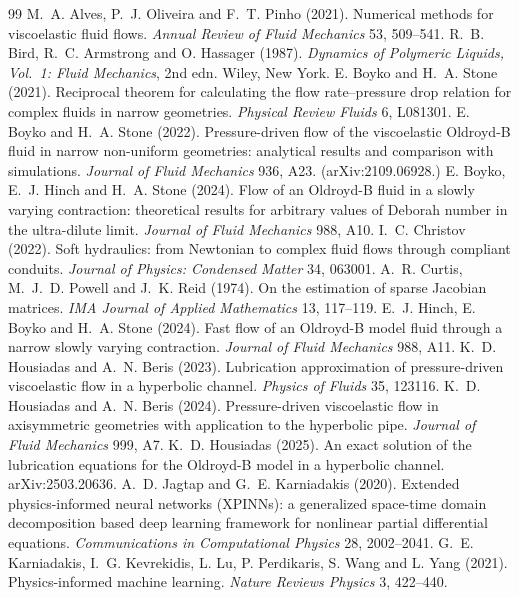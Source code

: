 \documentclass[11pt,a4paper]{article}
\begin{document}
\begin{thebibliography}{99}\small
\setlength{\itemsep}{1pt}
 M.~A. Alves, P.~J. Oliveira and F.~T. Pinho (2021). Numerical methods for viscoelastic fluid flows. \emph{Annual Review of Fluid Mechanics} 53, 509--541.
 R.~B. Bird, R.~C. Armstrong and O. Hassager (1987). \emph{Dynamics of Polymeric Liquids, Vol.~1: Fluid Mechanics}, 2nd edn. Wiley, New York.
 E. Boyko and H.~A. Stone (2021). Reciprocal theorem for calculating the flow rate--pressure drop relation for complex fluids in narrow geometries. \emph{Physical Review Fluids} 6, L081301.
 E. Boyko and H.~A. Stone (2022). Pressure-driven flow of the viscoelastic Oldroyd-B fluid in narrow non-uniform geometries: analytical results and comparison with simulations. \emph{Journal of Fluid Mechanics} 936, A23. (arXiv:2109.06928.)
 E. Boyko, E.~J. Hinch and H.~A. Stone (2024). Flow of an Oldroyd-B fluid in a slowly varying contraction: theoretical results for arbitrary values of Deborah number in the ultra-dilute limit. \emph{Journal of Fluid Mechanics} 988, A10.
 I.~C. Christov (2022). Soft hydraulics: from Newtonian to complex fluid flows through compliant conduits. \emph{Journal of Physics: Condensed Matter} 34, 063001.
 A.~R. Curtis, M.~J.~D. Powell and J.~K. Reid (1974). On the estimation of sparse Jacobian matrices. \emph{IMA Journal of Applied Mathematics} 13, 117--119.
 E.~J. Hinch, E. Boyko and H.~A. Stone (2024). Fast flow of an Oldroyd-B model fluid through a narrow slowly varying contraction. \emph{Journal of Fluid Mechanics} 988, A11.
 K.~D. Housiadas and A.~N. Beris (2023). Lubrication approximation of pressure-driven viscoelastic flow in a hyperbolic channel. \emph{Physics of Fluids} 35, 123116.
 K.~D. Housiadas and A.~N. Beris (2024). Pressure-driven viscoelastic flow in axisymmetric geometries with application to the hyperbolic pipe. \emph{Journal of Fluid Mechanics} 999, A7.
 K.~D. Housiadas (2025). An exact solution of the lubrication equations for the Oldroyd-B model in a hyperbolic channel. arXiv:2503.20636.
 A.~D. Jagtap and G.~E. Karniadakis (2020). Extended physics-informed neural networks (XPINNs): a generalized space-time domain decomposition based deep learning framework for nonlinear partial differential equations. \emph{Communications in Computational Physics} 28, 2002--2041.
 G.~E. Karniadakis, I.~G. Kevrekidis, L. Lu, P. Perdikaris, S. Wang and L. Yang (2021). Physics-informed machine learning. \emph{Nature Reviews Physics} 3, 422--440.

\end{thebibliography}
\end{document}
